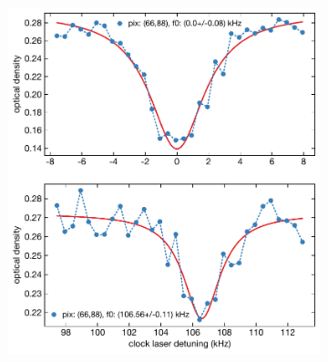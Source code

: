 
			\begin{figure}
			\centering 
			\begin{subfigure}[b]{0.4\linewidth}
				\includegraphics[scale=0.5]{figures/high_depth66_88.pdf}
				\caption{}
			\end{subfigure}
			\qquad\qquad
			\begin{subfigure}[b]{0.4\linewidth}

\end{subfigure}
\end{figure}
